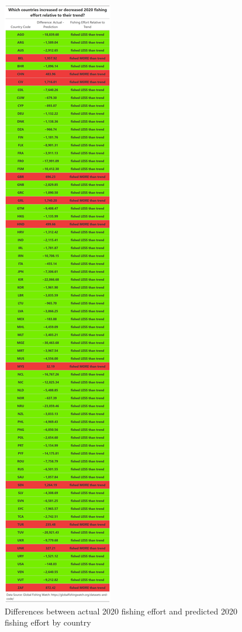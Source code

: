 \documentclass[
]{article}
\begin{document}
\begin{figure}
\centering
\includegraphics{pictures/good_bad_table_correct.png}
\caption{Differences between actual 2020 fishing effort and predicted
2020 fishing effort by country}
\end{figure}
\end{document}
